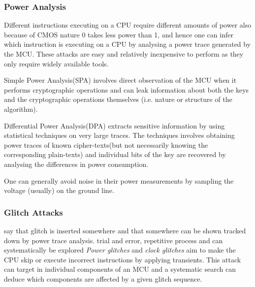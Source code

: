 	\subsubsection{Power Analysis}
	\label{subsubsec:power_analysis}
	Different instructions executing on a CPU require different amounts of power {\color{red}also because of CMOS nature 0 takes less power than 1}, and hence one can infer which instruction is executing on a CPU by analysing a power trace generated by the MCU. These attacks are easy and relatively inexpensive to perform as they only require widely available tools.
	
	Simple Power Analysis(SPA) involves direct observation of the MCU when it performs cryptographic operations and can leak information about both the keys and the cryptographic operations themselves (i.e. nature or structure of the algorithm)\citep{kocher:DPA}\citep{anderson:tamper_resistance}. 

	Differential Power Analysis(DPA) extracts sensitive information by using statistical techniques on very large traces. The techniques involves obtaining power traces of known cipher-texts(but not necessarily knowing the corresponding plain-texts) and individual bits of the key are recovered by analysing the differences in power consumption\citep{kocher:DPA}\citep{anderson:tamper_resistance}.
	
	One can generally avoid noise in their power measurements by sampling the voltage (usually) on the ground line\citep{sergei:thesis}.
	\subsubsection{Glitch Attacks}
	{\color{red} say that glitch is inserted somewhere and that somewhere can be shown tracked down by power trace analysis. trial and error, repetitive process and can systematically be explored \citep{website:riscure}}
	\emph{Power glitches} and \emph{clock glitches} aim to make the CPU skip or execute incorrect instructions by applying transients. This attack can target in individual components of an MCU and a systematic search can deduce which components are affected by a given glitch sequence.
	
